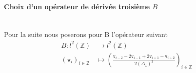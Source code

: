 \documentclass[12pt,a4paper]{article}
\numberwithin{equation}{section}
\begin{document}
\paragraph{Choix d'un opérateur de dérivée troisième $B$}\,\\

Pour la suite nous poserons pour B l'opérateur suivant
\begin{align*}
        B : l^2(\mathbb{Z}) &\longrightarrow l^2(\mathbb{Z})\\
        (\texttt{v}_i)_{i\in\mathbb{Z}} &\mapsto \left(\frac{\texttt{v}_{i-2} - 2\texttt{v}_{i-1} + 2\texttt{v}_{i+1}-\texttt{v}_{i+2} }{2(\Delta_x)^3}\right)_{i\in\mathbb{Z}}
\end{align*}
\end{document}
